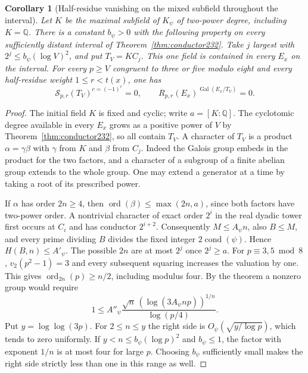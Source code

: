 \documentclass[a4paper,11pt]{article}
\newtheorem{corollary}[proposition]{Corollary}
\theoremstyle{definition}
\theoremstyle{remark}
\numberwithin{equation}{section}
\begin{document}
\begin{corollary}[Half-residue vanishing on the mixed subfield throughout the interval]
\leavevmode\label{cor:mixedhalf633}
Let \(K\) be the maximal subfield of \(K_\psi\) of two-power degree,
including \(K=\mathbb Q\). There is a constant \(b_\psi>0\) with
the following property on every sufficiently distant interval of
Theorem~\ref{thm:conductor232}. Take \(j\) largest with
\(2^j\le b_\psi(\log V)^2\), and put \(T_V=K C_j\).
This one field is contained in every \(E_x\) on the interval.
For every \(p\ge V\) congruent to three or five modulo eight and
every half-residue weight \(1\le r<t(x)\), one has
\[
       \mathcal S_{p,r}(T_V)^{c=(-1)^r}=0,\qquad
       R_{p,r}(E_x)^{\operatorname{Gal}(E_x/T_V)}=0 .
\]
\end{corollary}
\begin{proof}
The initial field \(K\) is fixed and cyclic; write \(a=[K:\mathbb Q]\).
The cyclotomic degree available in every \(E_x\) grows as a positive
power of \(V\) by Theorem~\ref{thm:conductor232}, so all contain
\(T_V\). A character of \(T_V\) is a product \(\alpha=\gamma\beta\)
with \(\gamma\) from \(K\) and \(\beta\) from \(C_j\). Indeed the
Galois group embeds in the product for the two factors, and a
character of a subgroup of a finite abelian group extends to the
whole group. One may extend a generator at a time by taking a root
of its prescribed power.

If \(\alpha\) has order \(2n\ge4\), then
\(\operatorname{ord}(\beta)\le\max(2n,a)\), since both factors
have two-power order. A nontrivial character of exact order \(2^i\)
in the real dyadic tower first occurs at \(C_i\) and has conductor
\(2^{i+2}\). Consequently \(M\le A_\psi n\), also \(B\le M\),
and every prime dividing \(B\) divides the fixed integer
\(2\operatorname{cond}(\psi)\). Hence \(H(B,n)\le A'_\psi\).
The possible \(2n\) are at most \(2^j\) once \(2^j\ge a\).
For \(p\equiv3,5\bmod8\), \(v_2(p^2-1)=3\) and every subsequent
squaring increases the valuation by one. This gives
\(\operatorname{ord}_{2n}(p)\ge n/2\), including modulus four.
By the theorem a nonzero group would require
\[
       1\le A''_\psi
            \frac{\sqrt n\,(\log(3A_\psi n p))^{1/n}}{\log(p/4)} .
\]
Put \(y=\log\log(3p)\). For \(2\le n\le y\) the right side is
\(O_\psi(\sqrt{y/\log p})\), which tends to zero uniformly.
If \(y<n\le b_\psi(\log p)^2\) and \(b_\psi\le1\), the factor
with exponent \(1/n\) is at most four for large \(p\). Choosing
\(b_\psi\) sufficiently small makes the right side strictly less
than one in this range as well.


\end{proof}
\end{document}
